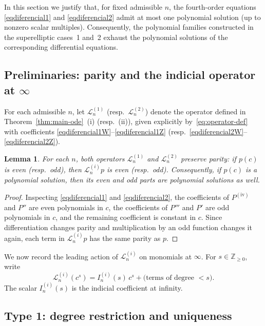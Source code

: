\documentclass[final,nopreprintline]{elsarticle}
\newtheorem{lemma}[theorem]{Lemma}
\theoremstyle{definition}
\numberwithin{equation}{section}
\theoremstyle{remark}
\begin{document}
In this section we justify that, for fixed admissible $n$, the fourth-order equations
\eqref{eqdiferencial1} and \eqref{eqdiferencial2} admit at most one polynomial solution
(up to nonzero scalar multiples). Consequently, the polynomial families constructed
in the superelliptic cases~1 and~2 exhaust the polynomial solutions of the corresponding
differential equations.

\subsection{Preliminaries: parity and the indicial operator at $\infty$}

For each admissible $n$, let $\mathcal{L}^{(1)}_n$ (resp.\ $\mathcal{L}^{(2)}_n$) denote
the operator defined in Theorem~\ref{thm:main-ode}~(i) (resp.~(ii)),
given explicitly by~\eqref{eq:operator-def} with coefficients
\eqref{eqdiferencial1W}--\eqref{eqdiferencial1Z}
(resp.\ \eqref{eqdiferencial2W}--\eqref{eqdiferencial2Z}).

\begin{lemma}\label{lem:parity}
For each $n$, both operators $\mathcal{L}^{(1)}_n$ and $\mathcal{L}^{(2)}_n$ preserve parity:
if $p(c)$ is even (resp.\ odd), then $\mathcal{L}^{(i)}_n p$ is even (resp.\ odd).
Consequently, if $p(c)$ is a polynomial solution, then its even and odd parts are polynomial
solutions as well.
\end{lemma}

\begin{proof}
Inspecting \eqref{eqdiferencial1} and \eqref{eqdiferencial2}, the coefficients of
$P^{(\mathrm{iv})}$ and $P''$ are even polynomials in $c$, the coefficients of $P'''$ and
$P'$ are odd polynomials in $c$, and the remaining coefficient is constant in $c$.
Since differentiation changes parity and multiplication by an odd function changes it again,
each term in $\mathcal{L}^{(i)}_n p$ has the same parity as $p$.
\end{proof}

We now record the leading action of $\mathcal{L}^{(i)}_n$ on monomials at $\infty$.
For $s\in\mathbb{Z}_{\ge0}$, write
\[
\mathcal{L}^{(i)}_n(c^s)=I^{(i)}_n(s)\,c^s+\text{(terms of degree $<s$)}.
\]
The scalar $I^{(i)}_n(s)$ is the indicial coefficient at infinity.

\subsection{Type 1: degree restriction and uniqueness}
\end{document}

